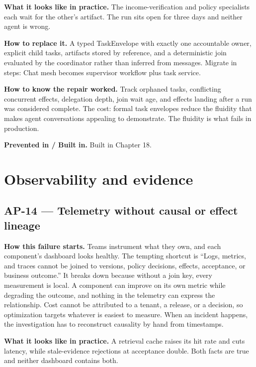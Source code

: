 \textbf{What it looks like in practice.} The income-verification and policy specialists each wait for the other's artifact. The run sits open for three days and neither agent is wrong.\par

\textbf{How to replace it.} A typed TaskEnvelope with exactly one accountable owner, explicit child tasks, artifacts stored by reference, and a deterministic join evaluated by the coordinator rather than inferred from messages. Migrate in steps: Chat mesh becomes supervisor workflow plus task service.\par

\textbf{How to know the repair worked.} Track orphaned tasks, conflicting concurrent effects, delegation depth, join wait age, and effects landing after a run was considered complete. The cost: formal task envelopes reduce the fluidity that makes agent conversations appealing to demonstrate. The fluidity is what fails in production.\par

\textbf{Prevented in / Built in.} Built in Chapter 18.\par

\section{Observability and evidence}

\subsection{AP-14 — Telemetry without causal or effect lineage}

\textbf{How this failure starts.} Teams instrument what they own, and each component's dashboard looks healthy. The tempting shortcut is “Logs, metrics, and traces cannot be joined to versions, policy decisions, effects, acceptance, or business outcome.” It breaks down because without a join key, every measurement is local. A component can improve on its own metric while degrading the outcome, and nothing in the telemetry can express the relationship. Cost cannot be attributed to a tenant, a release, or a decision, so optimization targets whatever is easiest to measure. When an incident happens, the investigation has to reconstruct causality by hand from timestamps.\par

\textbf{What it looks like in practice.} A retrieval cache raises its hit rate and cuts latency, while stale-evidence rejections at acceptance double. Both facts are true and neither dashboard contains both.\par

